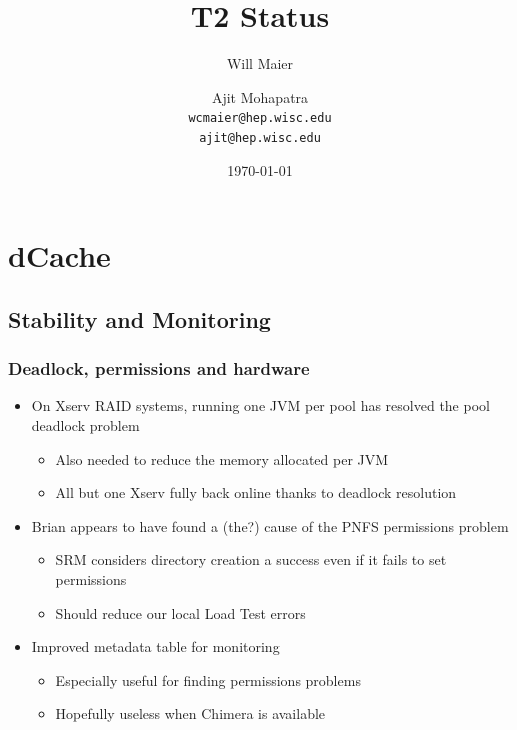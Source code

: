 \documentclass{beamer}
\title{T2 Status}
\author[Maier, Mohapatra]{
    Will Maier \and Ajit Mohapatra\\ 
    {\tt wcmaier@hep.wisc.edu}\\
    {\tt ajit@hep.wisc.edu}}
\institute[Wisconsin]{University of Wisconsin - High Energy Physics}
\date{\today}
\begin{document}
\begin{frame}
    \titlepage
\end{frame}


\section{dCache}
\subsection{Stability and Monitoring}
\begin{frame}
    \frametitle{Deadlock, permissions and hardware}
    \begin{itemize}
        \item On Xserv RAID systems, running one JVM per pool has resolved the pool deadlock problem
        \begin{itemize}
            \item Also needed to reduce the memory allocated per JVM
            \item All but one Xserv fully back online thanks to deadlock resolution
        \end{itemize}
        \item Brian appears to have found a (the?) cause of the PNFS permissions problem
        \begin{itemize}
            \item SRM considers directory creation a success even if it fails to set permissions
            \item Should reduce our local Load Test errors
        \end{itemize}
        \item Improved metadata table for monitoring
        \begin{itemize}
            \item Especially useful for finding permissions problems
            \item Hopefully useless when Chimera is available
        \end{itemize}
    \end{itemize}
    \end{frame}
\end{document}
